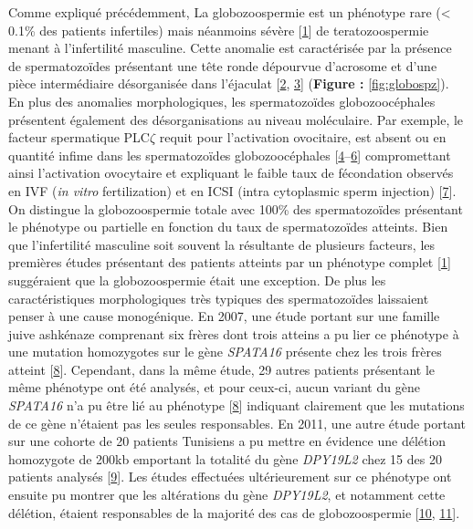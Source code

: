 \documentclass[12pt,twoside]{reedthesis}
\theoremstyle{definition}
\theoremstyle{definition}
\theoremstyle{remark}
\begin{document}
  Comme expliqué précédemment, La globozoospermie est un phénotype rare
  (\textless{} 0.1\% des patients infertiles) mais néanmoins sévère
  {[}\protect\hyperlink{ref-Sen2009}{1}{]} de teratozoospermie menant à
  l'infertilité masculine. Cette anomalie est caractérisée par la présence
  de spermatozoïdes présentant une tête ronde dépourvue d'acrosome et
  d'une pièce intermédiaire désorganisée dans l'éjaculat
  {[}\protect\hyperlink{ref-Singh}{2},
  \protect\hyperlink{ref-Pedersen1974}{3}{]} (\textbf{Figure :
  }\ref{fig:globospz}). En plus des anomalies morphologiques, les
  spermatozoïdes globozoocéphales présentent également des
  désorganisations au niveau moléculaire. Par exemple, le facteur
  spermatique PLC\(\zeta\) requit pour l'activation ovocitaire, est absent
  ou en quantité infime dans les spermatozoïdes globozoocéphales
  {[}\protect\hyperlink{ref-Heytens2009}{4}--\protect\hyperlink{ref-Yoon2008}{6}{]}
  compromettant ainsi l'activation ovocytaire et expliquant le faible taux
  de fécondation observés en IVF (\emph{in vitro} fertilization) et en
  ICSI (intra cytoplasmic sperm injection)
  {[}\protect\hyperlink{ref-Dam2006}{7}{]}. On distingue la
  globozoospermie totale avec 100\% des spermatozoïdes présentant le
  phénotype ou partielle en fonction du taux de spermatozoïdes atteints.
  Bien que l'infertilité masculine soit souvent la résultante de plusieurs
  facteurs, les premières études présentant des patients atteints par un
  phénotype complet {[}\protect\hyperlink{ref-Sen2009}{1}{]} suggéraient
  que la globozoospermie était une exception. De plus les caractéristiques
  morphologiques très typiques des spermatozoïdes laissaient penser à une
  cause monogénique. En 2007, une étude portant sur une famille juive
  ashkénaze comprenant six frères dont trois atteins a pu lier ce
  phénotype à une mutation homozygotes sur le gène \emph{SPATA16} présente
  chez les trois frères atteint {[}\protect\hyperlink{ref-Dam2007}{8}{]}.
  Cependant, dans la même étude, 29 autres patients présentant le même
  phénotype ont été analysés, et pour ceux-ci, aucun variant du gène
  \emph{SPATA16} n'a pu être lié au phénotype
  {[}\protect\hyperlink{ref-Dam2007}{8}{]} indiquant clairement que les
  mutations de ce gène n'étaient pas les seules responsables. En 2011, une
  autre étude portant sur une cohorte de 20 patients Tunisiens a pu mettre
  en évidence une délétion homozygote de 200kb emportant la totalité du
  gène \emph{DPY19L2} chez 15 des 20 patients analysés
  {[}\protect\hyperlink{ref-Harbuz2011}{9}{]}. Les études effectuées
  ultérieurement sur ce phénotype ont ensuite pu montrer que les
  altérations du gène \emph{DPY19L2}, et notamment cette délétion, étaient
  responsables de la majorité des cas de globozoospermie
  {[}\protect\hyperlink{ref-Ray2011}{10},
  \protect\hyperlink{ref-ElInati2012}{11}{]}.
  
\end{document}
